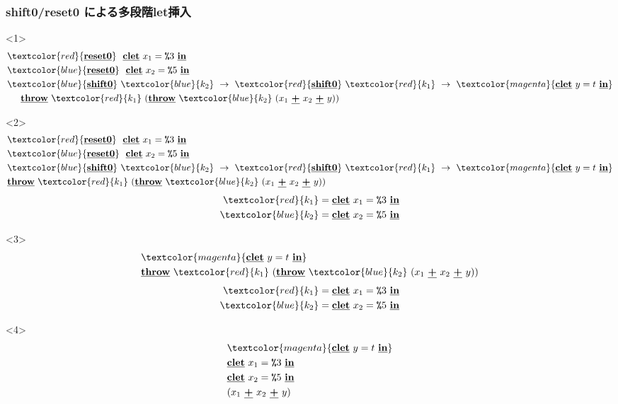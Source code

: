 \documentclass[dvipdfmx,cjk,xcolor=dvipsnames,envcountsect,notheorems,12pt]{beamer}
\newcommand\cResetz{\underline{\textbf{reset0}}}
\newcommand\cShiftz{\underline{\textbf{shift0}}}
\newcommand\cThrow{\underline{\textbf{throw}}}
\newcommand\cPlus{\underline{\textbf{+}}}
\newcommand\cLet{\underline{\textbf{clet}}}
\newcommand\cIn{\underline{\textbf{in}}}
\newcommand\csp[1]{\texttt{\%}{#1}}
\newcommand\red[1]{\textcolor{red}{#1}}
\newcommand\magenta[1]{\textcolor{magenta}{#1}}
\newcommand\blue[1]{\textcolor{blue}{#1}}
\theoremstyle{definition}
\begin{document}
\begin{frame}
  \frametitle{shift0/reset0 による多段階let挿入}
    \begin{onlyenv}<1>
    \begin{align*}
      & \red{\cResetz} ~~\cLet~x_1=\csp{3}~\cIn \\
      & \blue{\cResetz} ~~\cLet~x_2=\csp{5}~\cIn \\
      & \blue{\cShiftz}~\blue{k_2}~\to~ \red{\cShiftz}~\red{k_1}~\to~ \magenta{\cLet~y=t~\cIn} \\
      & \phantom{=}~~ \cThrow~\red{k_1}~(\cThrow~\blue{k_2}~(x_1~\cPlus~x_2~\cPlus~y))
    \end{align*}
  \end{onlyenv}

  \begin{onlyenv}<2>
    \begin{align*}
      & \red{\cResetz} ~~\cLet~x_1=\csp{3}~\cIn \\
      & \blue{\cResetz} ~~\cLet~x_2=\csp{5}~\cIn \\
      & \blue{\cShiftz}~\blue{k_2}~\to~ \red{\cShiftz}~\red{k_1}~\to~ \magenta{\cLet~y=t~\cIn} \\
      & \cThrow~\red{k_1}~(\cThrow~\blue{k_2}~(x_1~\cPlus~x_2~\cPlus~y))
    \end{align*}
    \begin{align*}
      \red{k_1} &= \cLet~x_1=\csp{3}~\cIn  \\
      \blue{k_2} &= \cLet~x_2=\csp{5}~\cIn  \\
    \end{align*}
  \end{onlyenv}

  \begin{onlyenv}<3>
    \begin{align*}
      & \magenta{\cLet~y=t~\cIn} \\
      & \cThrow~\red{k_1}~(\cThrow~\blue{k_2}~(x_1~\cPlus~x_2~\cPlus~y))
    \end{align*}
    \begin{align*}
      \red{k_1} &= \cLet~x_1=\csp{3}~\cIn  \\
      \blue{k_2} &= \cLet~x_2=\csp{5}~\cIn  \\
    \end{align*}
  \end{onlyenv}

  \begin{onlyenv}<4>
    \begin{align*}
      & \magenta{\cLet~y=t~\cIn} \\
      & \cLet~x_1=\csp{3}~\cIn \\
      & \cLet~x_2=\csp{5}~\cIn \\
      & (x_1~\cPlus~x_2~\cPlus~y)
    \end{align*}
  \end{onlyenv}
\end{frame}
\end{document}
